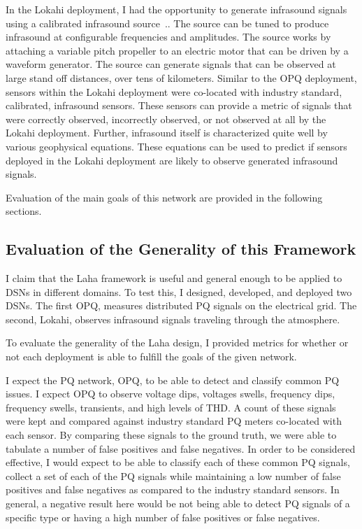 In the Lokahi deployment, I had the opportunity to generate infrasound signals using a calibrated infrasound source~\cite{park2009rotary}.. The source can be tuned to produce infrasound at configurable frequencies and amplitudes. The source works by attaching a variable pitch propeller to an electric motor that can be driven by a waveform generator. The source can generate signals that can be observed at large stand off distances, over tens of kilometers. Similar to the OPQ deployment, sensors within the Lokahi deployment were co-located with industry standard, calibrated, infrasound sensors. These sensors can provide a metric of signals that were correctly observed, incorrectly observed, or not observed at all by the Lokahi deployment. Further, infrasound itself is characterized quite well by various geophysical equations. These equations can be used to predict if sensors deployed in the Lokahi deployment are likely to observe generated infrasound signals.

Evaluation of the main goals of this network are provided in the following sections.

\subsection{Evaluation of the Generality of this Framework}\label{subsec:evaluation-of-the-generality-of-this-framework}
I claim that the Laha framework is useful and general enough to be applied to DSNs in different domains. To test this, I designed, developed, and deployed two DSNs. The first OPQ, measures distributed PQ signals on the electrical grid. The second, Lokahi, observes infrasound signals traveling through the atmosphere.

To evaluate the generality of the Laha design, I provided metrics for whether or not each deployment is able to fulfill the goals of the given network.

I expect the PQ network, OPQ, to be able to detect and classify common PQ issues. I expect OPQ to observe voltage dips, voltages swells, frequency dips, frequency swells, transients, and high levels of THD. A count of these signals were kept and compared against industry standard PQ meters co-located with each sensor. By comparing these signals to the ground truth, we were able to tabulate a number of false positives and false negatives. In order to be considered effective, I would expect to be able to classify each of these common PQ signals, collect a set of each of the PQ signals while maintaining a low number of false positives and false negatives as compared to the industry standard sensors. In general, a negative result here would be not being able to detect PQ signals of a specific type or having a high number of false positives or false negatives.

